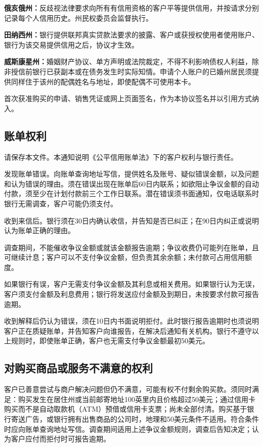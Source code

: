 \documentclass[UTF8,fontset=none,11pt,a4paper]{ctexart}
\begin{document}
\textbf{俄亥俄州：}反歧视法律要求向所有有信用资格的客户平等提供信用，并按请求分别记录每个人信用历史。州民权委员会\allowbreak\mbox{监督执行。}


\textbf{田纳西州：}银行提供联邦真实贷款法要求的披露、客户或获授权使用者使用账户、银行为该交易提供信用之后，协\allowbreak\mbox{议才生效。}


\textbf{威斯康星州：}婚姻财产协议、单方声明或法院裁定，不得不利影响债权人利益，除非授信前银行已获副本或在债务发生时实际知情。申请个人账户的已婚州居民须提供同样住于该州的配偶姓名与地址，即使配偶不可\allowbreak\mbox{使用本卡。}


首次获准购买的申请、销售凭证或网上页面签名，作为本协议签名并以引用\allowbreak\mbox{方式纳入。}


\subsection*{账单权利}
请保存本文件。本通知说明《公平信用账单法》下的客户权利与\allowbreak\mbox{银行责任。}


发现账单错误。向账单查询地址写信，提供姓名及账号、疑似错误金额，以及问题和认为错误的理由。须在错误出现在账单后60日内联系；如欲阻止争议金额的自动付款，须至少在计划付款前三个工作日联系。潜在错误须书面通知，仅电话联系时银行无需调查，客户可能\allowbreak\mbox{仍须支付。}


收到来信后。银行须在30日内确认收信，并告知是否已纠正；在90日内纠正或说明认为账单正\allowbreak\mbox{确的理由。}


调查期间，不能催收争议金额或就该金额报告逾期；争议收费仍可能列在账单，且可继续计息；客户可以不支付争议金额，但负责其余余额；未付款可占用\allowbreak\mbox{信用额度。}


如果银行有误，客户无需支付争议金额及其利息或相关费用。如果银行认为无误，客户须支付金额及利息费用；银行将发送应付金额及到期日，未按要求付款可\allowbreak\mbox{报告逾期。}


收到解释后仍认为错误，须在10日内书面说明拒付。此时银行报告逾期时也须说明客户正在质疑账单，并告知客户向谁报告，在解决后通知有关机构。银行不遵守以上规则时，即使账单正确，客户也无需支付争议金额最初50美元。


\subsection*{对购买商品或服务不满意的权利}
客户已善意尝试与商户解决问题但仍不满意，可能有权不付剩余购买款。须同时满足：购买发生在居住州或当前邮寄地址100英里内且价格超过50美元；通过信用卡购买而不是自动取款机（ATM）预借或信用卡支票；尚未全部付清。购买基于银行寄送广告，或银行拥有出售商品的公司时，地理和50美元条件不适用。符合条件时应向账单查询地址写信。调查期间适用上述争议金额规则，调查后告知决定；认为客户应付而拒付时可报\allowbreak\mbox{告逾期。}
\end{document}

